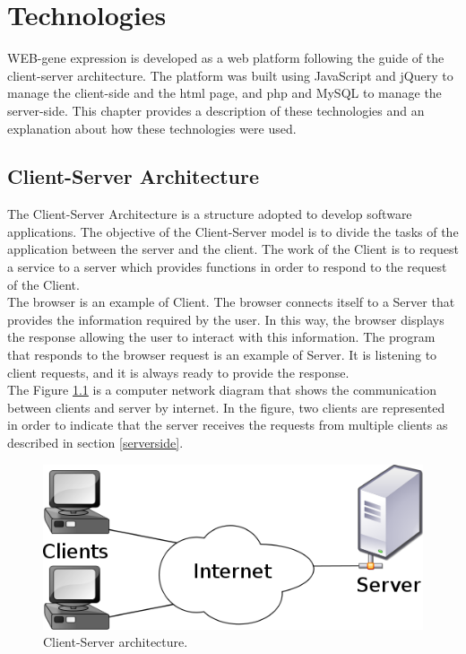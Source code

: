 \documentclass[a4paper]{report}
\begin{document}
\chapter{Technologies}
WEB-gene expression is developed as a web platform following the guide of the client-server architecture. The platform was built using JavaScript and jQuery to manage the client-side and the html page, and php and MySQL to manage the server-side. This chapter provides a description of these technologies and an explanation about how these technologies were used.

\section{Client-Server Architecture}

The Client-Server Architecture is a structure adopted to develop software applications. The objective of the Client-Server model is to divide the tasks of the application between the server and the client. The work of the Client is to request a service to a server which provides functions in order to respond to the request of the Client.\\
The browser is an example of Client. The browser connects itself to a Server that provides the information required by the user. In this way, the browser displays the response allowing the user to interact with this information. The program that responds to the browser request is an example of Server. It is listening to client requests, and it is always ready to provide the response.\\
The Figure \ref{clientServer} is a computer network diagram that shows the communication between clients and server by internet. In the figure, two clients are represented in order to indicate that the server receives the requests from multiple clients as described in section \ref{serverside}. 

\begin{figure}[htb] 
\begin{center}
\includegraphics[scale=0.4]{figure/clientServer.png} 
\end{center}
\caption{Client-Server architecture.}
\label{clientServer}
\end{figure}
\end{document}
